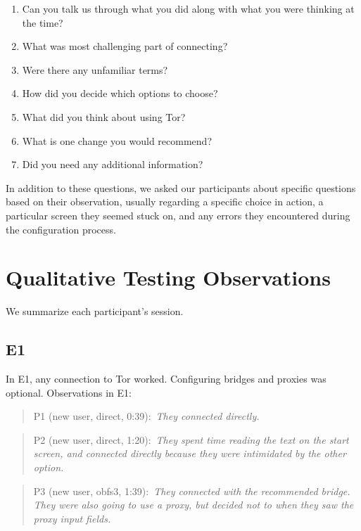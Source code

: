 \documentclass[USenglish,oneside,twocolumn]{article}
\newcommand{\pquote}[2]{
\begin{quotation}
\noindent #1:~\textit{#2}
\end{quotation}
}
\begin{document}
\begin{enumerate}
\item{Can you talk us through what you did along with what you were thinking at the time?}
\item{What was most challenging part of connecting?}
\item{Were there any unfamiliar terms?}
\item{How did you decide which options to choose?}
\item{What did you think about using Tor?}
\item{What is one change you would recommend?} 
\item{Did you need any additional information?} 
\end{enumerate}  

In addition to these questions, we asked our participants about specific questions based on their observation, usually regarding a specific choice in action, a particular screen they seemed stuck on, and any errors they encountered during the configuration process. 

\section{Qualitative Testing Observations}
\label{summary}
We summarize each participant's session.



\subsection{E1} 
In E1, any connection to Tor worked. Configuring bridges and proxies was optional.  
Observations in E1: 

\pquote{P1 (new user, direct, 0:39)}{They connected directly.}

\pquote{P2 (new user, direct, 1:20)}{They spent time reading the text on the start screen, and connected directly because they were intimidated by the other option.}

\pquote{P3 (new user, obfs3, 1:39)}{They connected with the recommended bridge. They were also going to use a proxy, but decided not to when they saw the proxy input fields.}
\end{document}
